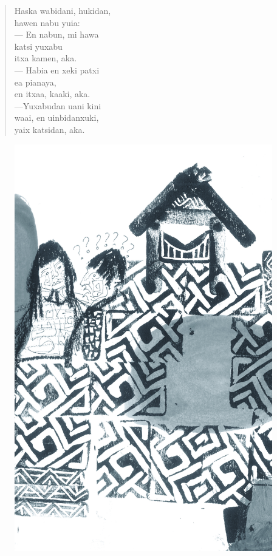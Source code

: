 \begin{verse}
Haska wabidani, hukidan,\\
hawen nabu yuia:\\
— En nabun, mi hawa\\
katsi yuxabu\\
itxa kamen, aka.\\
— Habia en xeki patxi\\
ea pianaya,\\
en itxaa, kaaki, aka.\\
—Yuxabudan uani kini\\
waai, en uinbidanxuki,\\
yaix katsidan, aka.
\end{verse}

\vspace*{\fill}

\pagebreak
\thispagestyle{empty}
\begin{figure}
\vspace*{-1.6cm}
\hspace*{-2.2cm}\includegraphics[width=138mm]{./imgs/img9.jpg}
\end{figure}

